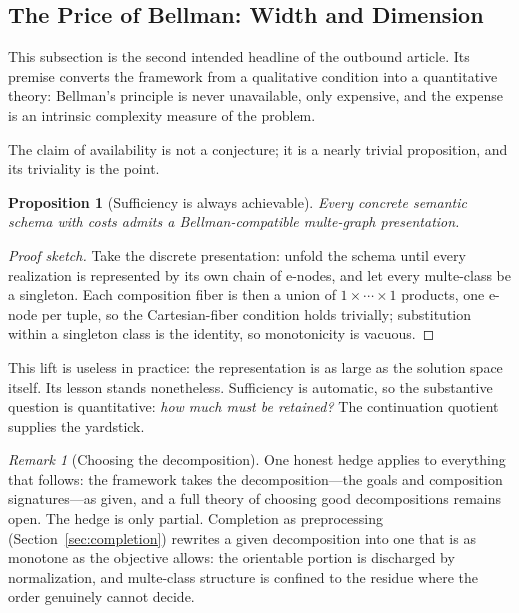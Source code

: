 \documentclass[sigconf,nonacm]{acmart}
\theoremstyle{definition}
\theoremstyle{plain}
\newtheorem{proposition}[definition]{Proposition}
\theoremstyle{remark}
\newtheorem{remark}[definition]{Remark}
\begin{document}
\subsection{The Price of Bellman: Width and Dimension}
\label{sec:width}

This subsection is the second intended headline of the outbound
article.  Its premise converts the framework from a qualitative
condition into a quantitative theory: Bellman's principle is never
unavailable, only expensive, and the expense is an intrinsic
complexity measure of the problem.

The claim of availability is not a conjecture; it is a nearly
trivial proposition, and its triviality is the point.

\begin{proposition}[Sufficiency is always achievable]
\label{prop:trivial}
Every concrete semantic schema with costs admits a
Bellman-compatible multe-graph presentation.
\end{proposition}

\begin{proof}[Proof sketch]
Take the discrete presentation: unfold the schema until every
realization is represented by its own chain of e-nodes, and let
every multe-class be a singleton.  Each composition fiber is then a
union of $1\times\cdots\times 1$ products, one e-node per tuple, so
the Cartesian-fiber condition holds trivially; substitution within a
singleton class is the identity, so monotonicity is vacuous.
\end{proof}

This lift is useless in practice: the representation is as large as
the solution space itself.  Its lesson stands nonetheless.
Sufficiency is automatic, so the substantive question is
quantitative: \emph{how much must be retained?}  The continuation
quotient supplies the yardstick.

\begin{remark}[Choosing the decomposition]
One honest hedge applies to everything that follows: the framework
takes the decomposition---the goals and composition signatures---as
given, and a full theory of choosing good decompositions remains
open.  The hedge is only partial.  Completion as preprocessing
(Section~\ref{sec:completion}) rewrites a given decomposition into
one that is as monotone as the objective allows: the orientable
portion is discharged by normalization, and multe-class structure is
confined to the residue where the order genuinely cannot decide.
\end{remark}
\end{document}
